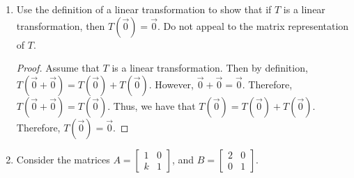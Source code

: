 \documentclass[letter]{article}
\newcommand{\mat}[1]{\begin{bmatrix}#1\end{bmatrix}}
\newenvironment{answer}{
	\begin{adjustwidth}{8mm}{} \vspace{2mm}}{\end{adjustwidth} \vspace{2mm}
}
\theoremstyle{plain}
\theoremstyle{definition}
\theoremstyle{remark}
\begin{document}
\begin{enumerate}
\begin{answer}
\begin{itemize}
\begin{itemize}
\[					\]
					\item $W = \mathcal{D} \circ \mathcal{H}$ since
					\[
					M_D M_H = \mat{1&0&0\\0&0&0\\0&0&0}\mat{0&0&1\\0&1&0\\-1&0&0} = \mat{0&0&1\\0&0&0\\0&0&0} = M_W.
					\]
				\end{itemize}
			\end{itemize}
		\end{answer}
		\item Use the definition of a linear transformation
			to show that if $T$ is a linear transformation, then $T(\vec{0}) = \vec{0}$.  
			Do not appeal to the matrix representation of $T$.
		\begin{answer}
			\begin{proof}
			Assume that $T$ is a linear transformation. Then by definition, $T(\vec{0} + \vec{0}) = T(\vec{0}) + T(\vec{0})$. However, $\vec{0} + \vec{0} = \vec{0}$. Therefore, $T(\vec{0} + \vec{0}) = T(\vec{0})$. Thus, we have that $T(\vec{0}) = T(\vec{0}) + T(\vec{0})$. Therefore, $T(\vec{0}) = \vec{0}$. 
			\end{proof}
		\end{answer}
		\item Consider the matrices $A = \mat{1 & 0 \\ k & 1}$, and $B = \mat{2 & 0 \\ 0 & 1}$.
		

\end{enumerate}
\end{document}
